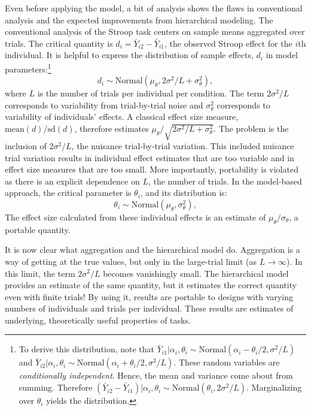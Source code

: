 \documentclass[english,man]{apa6}
\theoremstyle{definition}
\theoremstyle{definition}
\theoremstyle{definition}
\theoremstyle{remark}
\begin{document}
Even before applying the model, a bit of analysis shows the flaws in
conventional analysis and the expected improvements from hierarchical
modeling. The conventional analysis of the Stroop task centers on sample
means aggregated over trials. The critical quantity is
\(d_i=\bar{Y}_{i2}-\bar{Y}_{i1}\), the observed Stroop effect for the
\(i\)th individual. It is helpful to express the distribution of sample
effects, \(d_i\) in model parameters:\footnote{To derive this
  distribution, note that
  \(\bar{Y}_{i1}|\alpha_i,\theta_i \sim \mbox{Normal}(\alpha_{i}-\theta_{i}/2,\sigma^2/L)\)
  and
  \(\bar{Y}_{i2}|\alpha_i,\theta_i \sim \mbox{Normal}(\alpha_{i}+\theta_{i}/2,\sigma^2/L)\).
  These random variables are \emph{conditionally independent}. Hence,
  the mean and variance come about from summing. Therefore
  \((\bar{Y}_{i2}-\bar{Y}_{i1})|\alpha_i,\theta_i \sim \mbox{Normal}(\theta_i,2\sigma^2/L)\).
  Marginalizing over \(\theta_i\) yields the distribution.} \[
d_i \sim \mbox{Normal}(\mu_\theta, 2\sigma^2/L + \sigma^2_\theta),
\] where \(L\) is the number of trials per individual per condition. The
term \(2\sigma^2/L\) corresponds to variability from trial-by-trial
noise and \(\sigma^2_\theta\) corresponds to variability of individuals'
effects. A classical effect size measure,
\(\mbox{mean}(d)/\mbox{sd}(d)\), therefore estimates
\(\mu_\theta/\sqrt{2\sigma^2/L + \sigma^2_\theta}\). The problem is the
inclusion of \(2\sigma^2/L\), the nuisance trial-by-trial variation.
This included nuisance trial variation results in individual effect
estimates that are too variable and in effect size measures that are too
small. More importantly, portability is violated as there is an explicit
dependence on \(L\), the number of trials. In the model-based approach,
the critical parameter is \(\theta_i\), and its distribution is: \[
\theta_i \sim \mbox{Normal}(\mu_\theta,\sigma^2_\theta),
\] The effect size calculated from these individual effects is an
estimate of \(\mu_\theta/\sigma_\theta\), a portable quantity.

It is now clear what aggregation and the hierarchical model do.
Aggregation is a way of getting at the true values, but only in the
large-trial limit (as \(L\to\infty\)). In this limit, the term
\(2\sigma^2/L\) becomes vanishingly small. The hierarchical model
provides an estimate of the same quantity, but it estimates the correct
quantity even with finite trials! By using it, results are portable to
designs with varying numbers of individuals and trials per individual.
These results are estimates of underlying, theoretically useful
properties of tasks.
\end{document}
